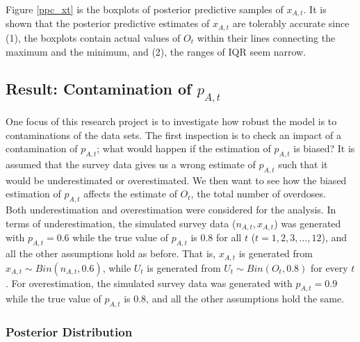 \documentclass[12pt]{article}
\begin{document}
{\begin{figure}[htb]
\end{figure}

Figure \ref{ppc_xt} is the boxplots of posterior predictive samples of $x_{A,t}$. It is shown that the posterior predictive estimates of $x_{A,t}$ are tolerably accurate since (1), the boxplots contain actual values of $O_t$ within their lines connecting the maximum and the minimum, and (2), the ranges of IQR seem narrow. \\



\subsection{Result: Contamination of $p_{A,t}$ } 
One focus of this research project is to investigate how robust the model is to contaminations of the data sets. The first inspection is to check an impact of a contamination of $p_{A,t}$; what would happen if the estimation of $p_{A,t}$ is biased? It is assumed that the survey data gives us a wrong estimate of $p_{A,t}$ such that it would be underestimated or overestimated. We then want to see how the biased estimation of $p_{A,t}$ affects the estimate of $O_t$, the total number of overdoses.\\

Both underestimation and overestimation were considered for the analysis. In terms of underestimation, the simulated survey data ($n_{A,t}, x_{A,t}$) was generated with $p_{A,t}=0.6$ while the true value of $p_{A,t}$ is 0.8 for all $t$ ($t=1,2,3, ..., 12$), and all the other assumptions hold as before. That is, $x_{A,t}$ is generated from $x_{A,t} \sim Bin(n_{A,t}, 0.6)$, while $U_t$ is generated from $U_t \sim Bin(O_t, 0.8)$ for every $t$. For overestimation, the simulated survey data was generated with $p_{A,t}=0.9$ while the true value of $p_{A,t}$ is 0.8, and all the other assumptions hold the same.  \\

\subsubsection{Posterior Distribution}

}
\end{document}
